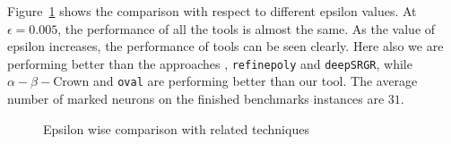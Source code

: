 Figure~\ref{res:ep:milp_with_milp} shows the comparison with respect to different epsilon values. 
At $\epsilon=0.005$, the performance of all the tools is almost the same. As the value of epsilon increases, the 
performance of tools can be seen clearly. Here also we are performing better than the approaches \deeppoly{}, 
\texttt{refinepoly} and \texttt{deepSRGR},
while $\alpha - \beta -$Crown and \texttt{oval} are performing better than our tool. 
The average number of marked neurons on the finished benchmarks instances are $31$. 


\begin{figure}
    \centering
    
    \caption{Epsilon wise comparison with related techniques}
    \label{res:ep:milp_with_milp}
\end{figure}
